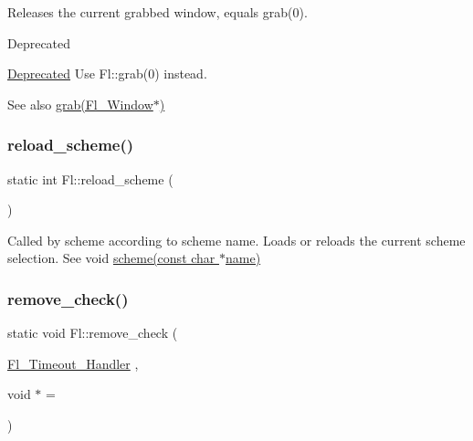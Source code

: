Releases the current grabbed window, equals grab(0). \begin{DoxyRefDesc}{Deprecated}
\item[\hyperlink{deprecated__deprecated000002}{Deprecated}]Use Fl\+::grab(0) instead. \end{DoxyRefDesc}
\begin{DoxySeeAlso}{See also}
\hyperlink{group__fl__windows_gaff9d012f19ac1d15214847bbabd5a890}{grab(\+Fl\+\_\+\+Window$\ast$)} 
\end{DoxySeeAlso}
\mbox{\label{class_fl_aa4b77e1d5b17c1c939fbaeca0a5512c7}} 
\subsubsection{\texorpdfstring{reload\+\_\+scheme()}{reload\_scheme()}}
{\footnotesize\ttfamily static int Fl\+::reload\+\_\+scheme (\begin{DoxyParamCaption}{ }\end{DoxyParamCaption})\hspace{0.3cm}{\ttfamily [static]}}

Called by scheme according to scheme name. Loads or reloads the current scheme selection. See void \hyperlink{class_fl_ad774b1783b1860e39556e209062648eb}{scheme(const char $\ast$name)} \mbox{\label{class_fl_af15855fe79825a8d3f9f7d5c21dced61}} 
\subsubsection{\texorpdfstring{remove\+\_\+check()}{remove\_check()}}
{\footnotesize\ttfamily static void Fl\+::remove\+\_\+check (\begin{DoxyParamCaption}\item[{\hyperlink{group__callback__functions_ga17b5c6570394124287997166a50ff07a}{Fl\+\_\+\+Timeout\+\_\+\+Handler}}]{,  }\item[{void $\ast$}]{ = {} }\end{DoxyParamCaption})\hspace{0.3cm}{\ttfamily [static]}}

\mbox{\label{class_fl_a1c7766bf3e45e170fe1741e98092e55f}} 
